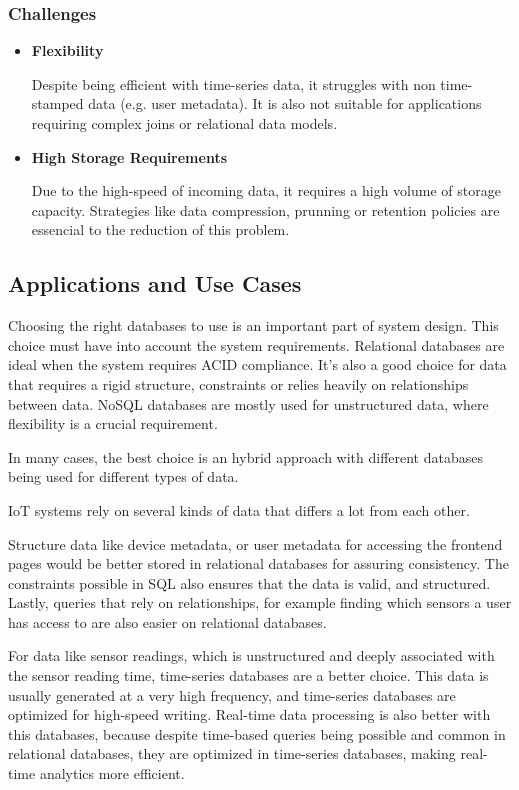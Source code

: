 \subsubsection{Challenges}

\begin{itemize}

	\item \textbf{Flexibility}

	      Despite being efficient with time-series data, it struggles with non
	      time-stamped data (e.g. user metadata). It is also not suitable for applications requiring
	      complex joins or relational data models.

	\item \textbf{High Storage Requirements}

	      Due to the high-speed of incoming data, it requires a high volume of storage
	      capacity. Strategies like data compression, prunning or retention policies
	      are essencial to the reduction of this problem.

\end{itemize}
\subsection{Applications and Use Cases}
Choosing the right databases to use is an important part of system design. This
choice must have into account the system requirements. Relational databases are
ideal when the system requires ACID compliance. It's also a good choice for
data that requires a rigid structure, constraints or relies heavily on
relationships between data. NoSQL databases are mostly used for unstructured
data, where flexibility is a crucial requirement.

In many cases, the best choice is an hybrid approach with different databases
being used for different types of data.

IoT systems rely on several kinds of data that differs a lot from each other.

Structure data like device metadata, or user metadata for accessing the
frontend pages would be better stored in relational databases for assuring
consistency. The constraints possible in SQL also ensures that the data is valid,
and structured. Lastly, queries that rely on relationships, for example finding
which sensors a user has access to are also easier on relational databases.

For data like sensor readings, which is unstructured and deeply associated with
the sensor reading time, time-series databases are a better choice. This data
is usually generated at a very high frequency, and time-series databases are
optimized for high-speed writing. Real-time data processing is also better with
this databases, because despite time-based queries being possible and common in
relational databases, they are optimized in time-series databases, making
real-time analytics more efficient.

